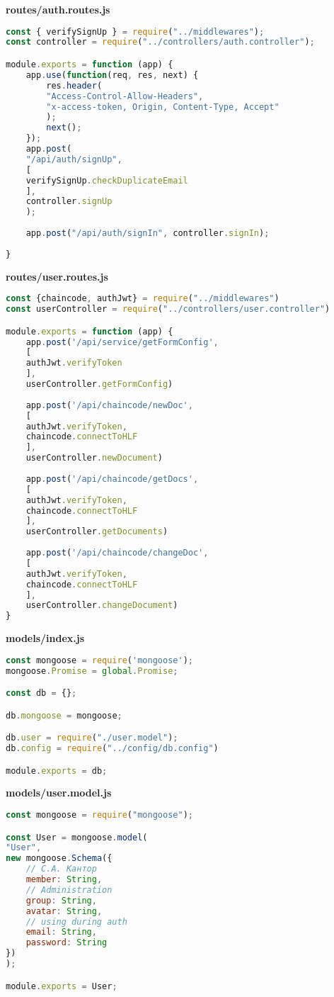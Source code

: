 \textbf{routes/auth.routes.js}
\begin{lstlisting}[language=JavaScript]
const { verifySignUp } = require("../middlewares");
const controller = require("../controllers/auth.controller");

module.exports = function (app) {
	app.use(function(req, res, next) {
		res.header(
		"Access-Control-Allow-Headers",
		"x-access-token, Origin, Content-Type, Accept"
		);
		next();
	});
	app.post(
	"/api/auth/signUp",
	[
	verifySignUp.checkDuplicateEmail
	],
	controller.signUp
	);
	
	app.post("/api/auth/signIn", controller.signIn);
	
}
\end{lstlisting}

\textbf{routes/user.routes.js}
\begin{lstlisting}[language=JavaScript]
const {chaincode, authJwt} = require("../middlewares")
const userController = require("../controllers/user.controller")

module.exports = function (app) {
	app.post('/api/service/getFormConfig',
	[
	authJwt.verifyToken
	],
	userController.getFormConfig)
	
	app.post('/api/chaincode/newDoc',
	[
	authJwt.verifyToken,
	chaincode.connectToHLF
	],
	userController.newDocument)
	
	app.post('/api/chaincode/getDocs',
	[
	authJwt.verifyToken,
	chaincode.connectToHLF
	],
	userController.getDocuments)
	
	app.post('/api/chaincode/changeDoc',
	[
	authJwt.verifyToken,
	chaincode.connectToHLF
	],
	userController.changeDocument)
}
\end{lstlisting}

\textbf{models/index.js}
\begin{lstlisting}[language=JavaScript]
const mongoose = require('mongoose');
mongoose.Promise = global.Promise;

const db = {};

db.mongoose = mongoose;

db.user = require("./user.model");
db.config = require("../config/db.config")

module.exports = db;	
\end{lstlisting}

\textbf{models/user.model.js}
\begin{lstlisting}[language=JavaScript]
const mongoose = require("mongoose");

const User = mongoose.model(
"User",
new mongoose.Schema({
	// С.А. Кантор
	member: String,
	// Administration
	group: String,
	avatar: String,
	// using during auth
	email: String,
	password: String
})
);

module.exports = User;	
\end{lstlisting}

